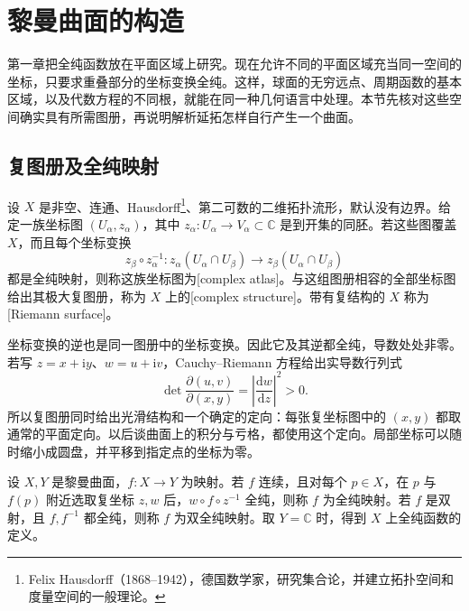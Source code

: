 
% 
% 

\section{黎曼曲面的构造}
\label{g4:sec:0201}

第一章把全纯函数放在平面区域上研究。现在允许不同的平面区域充当同一空间的坐标，只要求重叠部分的坐标变换全纯。这样，球面的无穷远点、周期函数的基本区域，以及代数方程的不同根，就能在同一种几何语言中处理。本节先核对这些空间确实具有所需图册，再说明解析延拓怎样自行产生一个曲面。

\subsection{复图册及全纯映射}
\label{g4:subsec:0201:01}

\begin{definition}[黎曼曲面]
	\label{g4:def:0201:riemann-surface}
	设 \(X\) 是非空、连通、Hausdorff\footnote{Felix Hausdorff（1868--1942），德国数学家，研究集合论，并建立拓扑空间和度量空间的一般理论。}、第二可数的二维拓扑流形，默认没有边界。给定一族坐标图 \((U_\alpha,z_\alpha)\)，其中 \(z_\alpha:U_\alpha\to V_\alpha\subset\mathbb C\) 是到开集的同胚。若这些图覆盖 \(X\)，而且每个坐标变换
	\[
		z_\beta\circ z_\alpha^{-1}:z_\alpha(U_\alpha\cap U_\beta)\longrightarrow z_\beta(U_\alpha\cap U_\beta)
	\]
	都是全纯映射，则称这族坐标图为[complex atlas]。与这组图册相容的全部坐标图给出其极大复图册，称为 \(X\) 上的[complex structure]。带有复结构的 \(X\) 称为[Riemann surface]。
\end{definition}

坐标变换的逆也是同一图册中的坐标变换。因此它及其逆都全纯，导数处处非零。若写 \(z=x+\mathrm{i}y\)、\(w=u+\mathrm{i}v\)，Cauchy--Riemann 方程给出实导数行列式
\[
	\det\frac{\partial(u,v)}{\partial(x,y)}=\left|\frac{\mathrm{d}w}{\mathrm{d}z}\right|^2>0.
\]
所以复图册同时给出光滑结构和一个确定的定向：每张复坐标图中的 \((x,y)\) 都取通常的平面定向。以后谈曲面上的积分与亏格，都使用这个定向。局部坐标可以随时缩小成圆盘，并平移到指定点的坐标为零。

\begin{definition}[曲面间的全纯映射]
	\label{g4:def:0201:holomorphic-map}
	设 \(X,Y\) 是黎曼曲面，\(f:X\to Y\) 为映射。若 \(f\) 连续，且对每个 \(p\in X\)，在 \(p\) 与 \(f(p)\) 附近选取复坐标 \(z,w\) 后，\(w\circ f\circ z^{-1}\) 全纯，则称 \(f\) 为全纯映射。若 \(f\) 是双射，且 \(f,f^{-1}\) 都全纯，则称 \(f\) 为双全纯映射。取 \(Y=\mathbb C\) 时，得到 \(X\) 上全纯函数的定义。
\end{definition}

